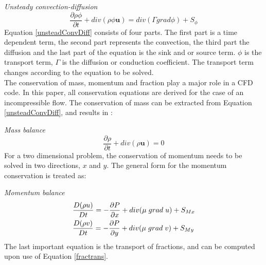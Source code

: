 \documentclass{CFD2017}
\begin{document}
\emph{Unsteady convection-diffusion}
\begin{equation}
\label{unsteadConvDiff}
\frac{\partial \rho \phi}{\partial t} + div(\rho\phi\mathbf u)= div(\Gamma grad \phi)+S_{\phi}
\end{equation}
Equation \ref{unsteadConvDiff} consists of four parts. The first part is a time dependent term, the second part represents the convection, the third part the diffusion and the last part of the equation is the sink and or source term. $\phi$ is the transport term, $\Gamma$ is the diffusion or conduction coefficient. The transport term changes according to the equation to be solved. \\
The conservation of mass, momentum and fraction play a major role in a CFD code. In this paper, all conservation equations are derived for the case of an incompressible flow. The conservation of mass can be extracted from Equation \ref{unsteadConvDiff}, and results in \cite{slides}:\vspace{2mm}

\emph{Mass balance}
\begin{equation}
\label{MassBal}
\frac{\partial \rho }{\partial t} + div(\rho\mathbf u)= 0
\end{equation}
For a two dimensional problem, the conservation of momentum needs to be solved in two directions, $x$ and $y$. The general form for the momentum conservation is treated as:\vspace{2mm}

\emph{Momentum balance}
\begin{equation}
\begin{split}
\label{MomBal}
&\frac{D( \rho u) }{D t} =-\frac{\partial P}{\partial x} + div(\mu \hspace{1mm} grad\hspace{1mm}u)+S_{Mx}\\ 
&\frac{D( \rho v) }{D t} =-\frac{\partial P}{\partial y} + div(\mu \hspace{1mm} grad\hspace{1mm}v)+S_{My}\\ 
\end{split}
\end{equation}
The last important equation is the transport of fractions, and can be computed upon use of Equation \ref{fractrans}.\vspace{2mm}
\end{document}

